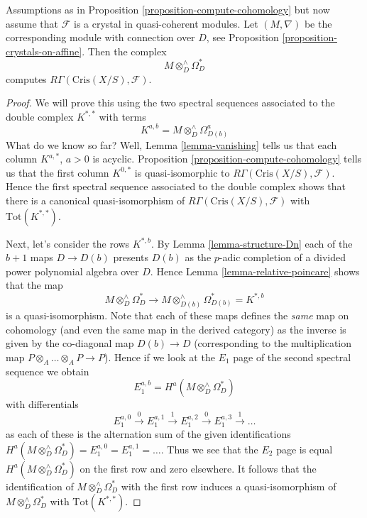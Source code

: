 \begin{proposition}
\label{proposition-compute-cohomology-crystal}
Assumptions as in Proposition \ref{proposition-compute-cohomology}
but now assume that $\mathcal{F}$ is a crystal in quasi-coherent modules.
Let $(M, \nabla)$ be the corresponding module with connection over $D$, see
Proposition \ref{proposition-crystals-on-affine}. Then the complex
$$
M \otimes^\wedge_D \Omega^*_D
$$
computes $R\Gamma(\text{Cris}(X/S), \mathcal{F})$.
\end{proposition}

\begin{proof}
We will prove this using the two spectral sequences associated to the
double complex $K^{*, *}$ with terms
$$
K^{a, b} = M \otimes_D^\wedge \Omega^a_{D(b)}
$$
What do we know so far? Well, Lemma \ref{lemma-vanishing}
tells us that each column $K^{a, *}$, $a > 0$ is acyclic.
Proposition \ref{proposition-compute-cohomology} tells us that
the first column $K^{0, *}$ is quasi-isomorphic to
$R\Gamma(\text{Cris}(X/S), \mathcal{F})$.
Hence the first spectral sequence associated to the double complex
shows that there is a canonical quasi-isomorphism of
$R\Gamma(\text{Cris}(X/S), \mathcal{F})$ with
$\text{Tot}(K^{*, *})$.

\medskip\noindent
Next, let's consider the rows $K^{*, b}$. By
Lemma \ref{lemma-structure-Dn}
each of the $b + 1$ maps $D \to D(b)$ presents $D(b)$ as the $p$-adic
completion of a divided power polynomial algebra over $D$.
Hence Lemma \ref{lemma-relative-poincare} shows that the map
$$
M \otimes^\wedge_D\Omega^*_D
\longrightarrow
M \otimes^\wedge_{D(b)} \Omega^*_{D(b)} = K^{*, b}
$$
is a quasi-isomorphism. Note that each of these maps defines the {\it same}
map on cohomology (and even the same map in the derived category) as
the inverse is given by the co-diagonal map $D(b) \to D$ (corresponding
to the multiplication map $P \otimes_A \ldots \otimes_A P \to P$).
Hence if we look at the $E_1$ page of the second spectral sequence
we obtain
$$
E_1^{a, b} = H^a(M \otimes^\wedge_D\Omega^*_D)
$$
with differentials
$$
E_1^{a, 0} \xrightarrow{0}
E_1^{a, 1} \xrightarrow{1}
E_1^{a, 2} \xrightarrow{0}
E_1^{a, 3} \xrightarrow{1} \ldots
$$
as each of these is the alternation sum of the given identifications
$H^a(M \otimes^\wedge_D\Omega^*_D) = E_1^{a, 0} = E_1^{a, 1} = \ldots$.
Thus we see that the $E_2$ page is equal $H^a(M \otimes^\wedge_D\Omega^*_D)$
on the first row and zero elsewhere. It follows that the identification
of $M \otimes^\wedge_D\Omega^*_D$ with the first row induces a
quasi-isomorphism of $M \otimes^\wedge_D\Omega^*_D$ with
$\text{Tot}(K^{*, *})$.
\end{proof}